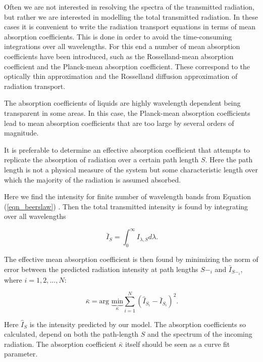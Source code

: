 Often we are not interested in resolving the spectra of the transmitted radiation, but rather we are interested in modelling the total transmitted radiation.  In these cases it is convenient to write the radiation transport equations in terms of mean absorption coefficients. This is done in order to avoid the time-consuming integrations over all wavelengths. For this end a number of mean absorption coefficients have been introduced, such as the Rosselland-mean absorption coefficient and the Planck-mean absorption coefficient. These correspond to the optically thin approximation and the Rosselland diffusion approximation of radiation transport.

The absorption coefficients of liquids are highly wavelength dependent being transparent in some areas. In this case, the Planck-mean absorption coefficients lead to mean absorption coefficients that are too large by several orders of magnitude. 

It is preferable to determine an effective absorption coefficient that attempts to replicate the absorption of radiation over a certain path length $S$. Here the path length is not a physical measure of the system but some characteristic length over which the majority of the radiation is assumed absorbed.

Here we find the intensity for finite number of wavelength bands from Equation (\ref{eqn_beerslaw}) . Then the total transmitted intensity is found by integrating over all wavelengths

\begin{equation}
\label{eqn_totintens}
     \ \bar{I}_S = \int_{0}^{\infty} I_{\lambda,S} d\lambda \mbox{.}
\end{equation}

The effective mean absorption coefficient is then found by minimizing the norm of error between the predicted radiation intensity at path lengths $S-_i$ and $\bar{I}_{S-_i}$, where $i=1,2,...,N$:

\begin{equation}
\label{eqn_effcoeff}
     \ \bar{\kappa} = \mbox{arg } \underbrace{\mbox{min}}_{\kappa} \sum_{i=1}^{N} \left(\hat{I}_{S_i}-\bar{I}_{S_i}\right)^{2}  \mbox{.}
\end{equation}

Here $\hat{I}_S$ is the intensity predicted by our model.  The absorption coefficients so calculated, depend on both the path-length $S$ and the spectrum of the incoming radiation. The absorption coefficient $\bar{\kappa}$ itself should be seen as a curve fit parameter.

